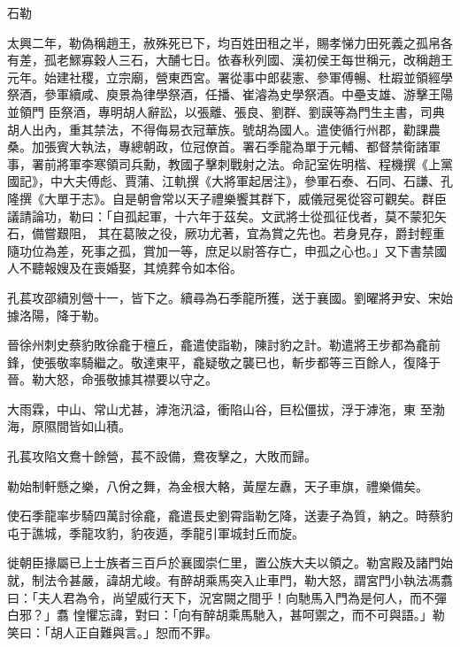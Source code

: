 
\begin{pinyinscope}
石勒



 太興二年，勒偽稱趙王，赦殊死已下，均百姓田租之半，賜孝悌力田死義之孤帛各有差，孤老鰥寡穀人三石，大酺七日。依春秋列國、漢初侯王每世稱元，改稱趙王元年。始建社稷，立宗廟，營東西宮。署從事中郎裴憲、參軍傅暢、杜嘏並領經學祭酒，參軍續咸、庾景為律學祭酒，任播、崔濬為史學祭酒。中壘支雄、游擊王陽並領門
 臣祭酒，專明胡人辭訟，以張離、張良、劉群、劉謨等為門生主書，司典胡人出內，重其禁法，不得侮易衣冠華族。號胡為國人。遣使循行州郡，勸課農桑。加張賓大執法，專總朝政，位冠僚首。署石季龍為單于元輔、都督禁衛諸軍事，署前將軍李寒領司兵勳，教國子擊刺戰射之法。命記室佐明楷、程機撰《上黨國記》，中大夫傅彪、賈蒲、江軌撰《大將軍起居注》，參軍石泰、石同、石謙、孔隆撰《大單于志》。自是朝會常以天子禮樂饗其群下，威儀冠冕從容可觀矣。群臣議請論功，勒曰：「自孤起軍，十六年于茲矣。文武將士從孤征伐者，莫不蒙犯矢石，備嘗艱阻，
 其在葛陂之役，厥功尤著，宜為賞之先也。若身見存，爵封輕重隨功位為差，死事之孤，賞加一等，庶足以尉答存亡，申孤之心也。」又下書禁國人不聽報嫂及在喪婚娶，其燒葬令如本俗。



 孔萇攻邵續別營十一，皆下之。續尋為石季龍所獲，送于襄國。劉曜將尹安、宋始據洛陽，降于勒。



 晉徐州刺史蔡豹敗徐龕于檀丘，龕遣使詣勒，陳討豹之計。勒遣將王步都為龕前鋒，使張敬率騎繼之。敬達東平，龕疑敬之襲已也，斬步都等三百餘人，復降于晉。勒大怒，命張敬據其襟要以守之。



 大雨霖，中山、常山尤甚，滹沲汛溢，衝陷山谷，巨松僵拔，浮于滹沲，東
 至渤海，原隰間皆如山積。



 孔萇攻陷文鴦十餘營，萇不設備，鴦夜擊之，大敗而歸。



 勒始制軒懸之樂，八佾之舞，為金根大輅，黃屋左纛，天子車旗，禮樂備矣。



 使石季龍率步騎四萬討徐龕，龕遣長史劉霄詣勒乞降，送妻子為質，納之。時蔡豹屯于譙城，季龍攻豹，豹夜遁，季龍引軍城封丘而旋。



 徙朝臣掾屬已上士族者三百戶於襄國崇仁里，置公族大夫以領之。勒宮殿及諸門始就，制法令甚嚴，諱胡尤峻。有醉胡乘馬突入止車門，勒大怒，謂宮門小執法馮翥曰：「夫人君為令，尚望威行天下，況宮闕之間乎！向馳馬入門為是何人，而不彈白邪？」翥
 惶懼忘諱，對曰：「向有醉胡乘馬馳入，甚呵禦之，而不可與語。」勒笑曰：「胡人正自難與言。」恕而不罪。




\end{pinyinscope}
